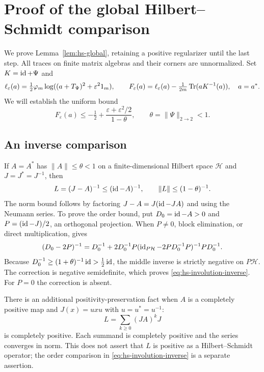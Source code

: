 \section{Proof of the global Hilbert--Schmidt comparison}
\label{app:comparison}

We prove Lemma~\ref{lem:hs-global}, retaining a positive regularizer until the last step.
All traces on finite matrix algebras and their corners are unnormalized.
Set $K=\operatorname{id}+\Psi$ and
\[
 \ell_\varepsilon(a)=\tfrac12\varphi_m
       \log((a+T_\Psi)^2+\varepsilon^21_m),\qquad
 F_\varepsilon(a)=\ell_\varepsilon(a)
       -\tfrac1{2m}\operatorname{Tr}(aK^{-1}(a)),\quad a=a^*.
\]
We will establish the uniform bound
\begin{equation}\label{eq:hs-regularized-global}
 F_\varepsilon(a)\le-\tfrac12+
              \frac{\varepsilon+\varepsilon^2/2}{1-\theta},
 \qquad \theta=\|\Psi\|_{2\to2}<1.
\end{equation}

\subsection{An inverse comparison}
If $A=A^*$ has $\|A\|\le\theta<1$ on a finite-dimensional Hilbert space $\mathcal H$ and $J=J^*=J^{-1}$, then
\begin{equation}\label{eq:hs-involution-inverse}
 L=(J-A)^{-1}\le(\operatorname{id}-A)^{-1},\qquad
 \|L\|\le(1-\theta)^{-1}.
\end{equation}
The norm bound follows by factoring $J-A=J(\operatorname{id}-JA)$ and using the Neumann series.
To prove the order bound, put $D_0=\operatorname{id}-A>0$ and $P=(\operatorname{id}-J)/2$, an orthogonal projection.
When $P\ne0$, block elimination, or direct multiplication, gives
\[
 (D_0-2P)^{-1}=D_0^{-1}+2D_0^{-1}P
   (\operatorname{id}_{P\mathcal H}-2PD_0^{-1}P)^{-1}PD_0^{-1}.
\]
Because $D_0^{-1}\ge(1+\theta)^{-1}\operatorname{id}>\tfrac12\operatorname{id}$, the middle inverse is strictly negative on $P\mathcal H$.
The correction is negative semidefinite, which proves \eqref{eq:hs-involution-inverse}.
For $P=0$ the correction is absent.

There is an additional positivity-preservation fact when $A$ is a completely positive map and $J(x)=uxu$ with $u=u^*=u^{-1}$:
\begin{equation}\label{eq:hs-inverse-cp}
 L=\sum_{k\ge0}(JA)^kJ
\end{equation}
is completely positive.
Each summand is completely positive and the series converges in norm.
This does not assert that $L$ is positive as a Hilbert--Schmidt operator; the order comparison in \eqref{eq:hs-involution-inverse} is a separate assertion.

